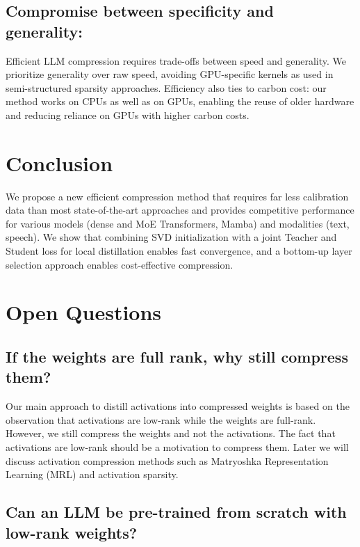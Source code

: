 \subsection{Compromise between specificity and generality:}
Efficient LLM compression requires trade-offs between speed and generality. We prioritize generality over raw speed, avoiding GPU-specific kernels as used in semi-structured sparsity approaches. Efficiency also ties to carbon cost: our method works on CPUs as well as on
GPUs, enabling the reuse of older hardware and reducing reliance on GPUs with higher carbon costs.

\section{Conclusion}
We propose a new efficient compression method that
requires far less calibration data than most state-of-the-art approaches
and provides competitive performance for various models (dense and MoE Transformers, Mamba) and modalities (text, speech).
We show that combining SVD initialization with a joint Teacher and Student loss for local distillation enables fast convergence, and a bottom-up layer selection approach enables cost-effective compression.

\section{Open Questions}
\subsection{If the weights are full rank, why still compress them?}
Our main approach to distill activations into compressed weights is based on the observation that activations are low-rank while the weights are full-rank. However, we still compress the weights and not the activations. The fact that activations are low-rank should be a motivation to compress them. Later we will discuss activation compression methods such as Matryoshka Representation Learning (MRL) and activation sparsity.

\subsection{Can an LLM be pre-trained from scratch with low-rank weights?}
